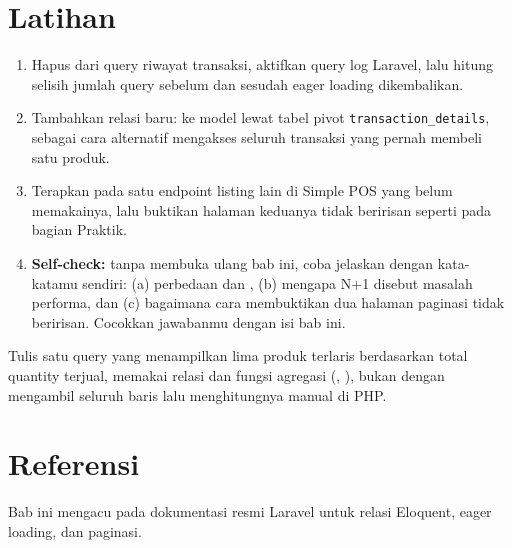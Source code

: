 \section{Latihan}

\begin{enumerate}
  \item Hapus  dari query riwayat
    transaksi, aktifkan query log Laravel, lalu hitung selisih jumlah
    query sebelum dan sesudah eager loading dikembalikan.
  \item Tambahkan relasi baru:  ke
    model  lewat tabel pivot
    \texttt{transaction\_details}, sebagai cara alternatif mengakses
    seluruh transaksi yang pernah membeli satu produk.
  \item Terapkan  pada satu endpoint listing lain
    di Simple POS yang belum memakainya, lalu buktikan halaman
    keduanya tidak beririsan seperti pada bagian Praktik.
  \item \textbf{Self-check:} tanpa membuka ulang bab ini, coba jelaskan
    dengan kata-katamu sendiri: (a) perbedaan  dan
    , (b) mengapa N+1 disebut masalah performa,
    dan (c) bagaimana cara membuktikan dua halaman paginasi tidak
    beririsan. Cocokkan jawabanmu dengan isi bab ini.
\end{enumerate}

\begin{challengebox}
Tulis satu query yang menampilkan lima produk terlaris berdasarkan
total quantity terjual, memakai relasi 
dan fungsi agregasi (, ), bukan dengan
mengambil seluruh baris lalu menghitungnya manual di PHP.
\end{challengebox}

\section{Referensi}

Bab ini mengacu pada dokumentasi resmi Laravel \cite{laraveldocs} untuk
relasi Eloquent, eager loading, dan paginasi.
